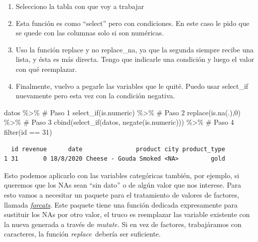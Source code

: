 \documentclass[
  letterpaper,
  DIV=11,
  numbers=noendperiod]{scrreprt}
\newenvironment{Shaded}{\begin{snugshade}}{\end{snugshade}}
\newcommand{\CommentTok}[1]{\textcolor[rgb]{0.37,0.37,0.37}{#1}}
\newcommand{\DecValTok}[1]{\textcolor[rgb]{0.68,0.00,0.00}{#1}}
\newcommand{\FunctionTok}[1]{\textcolor[rgb]{0.28,0.35,0.67}{#1}}
\newcommand{\NormalTok}[1]{\textcolor[rgb]{0.00,0.23,0.31}{#1}}
\newcommand{\SpecialCharTok}[1]{\textcolor[rgb]{0.37,0.37,0.37}{#1}}
\providecommand{\tightlist}{%
  \setlength{\itemsep}{0pt}\setlength{\parskip}{0pt}}\usepackage{longtable,booktabs,array}
\begin{document}
\begin{enumerate}
\def\labelenumi{\arabic{enumi}.}
\tightlist
\item
  Selecciono la tabla con que voy a trabajar
\item
  Esta función es como ``select'' pero con condiciones. En este caso le
  pido que se quede con las columnas solo si son numéricas.
\item
  Uso la función replace y no replace\_na, ya que la segunda siempre
  recibe una lista, y ésta es más directa. Tengo que indicarle una
  condición y luego el valor con qué reemplazar.
\item
  Finalmente, vuelvo a pegarle las variables que le quité. Puedo usar
  select\_if nuevamente pero esta vez con la condición negativa.
\end{enumerate}

\begin{Shaded}
\begin{Highlighting}[]
\NormalTok{datos }\SpecialCharTok{\%\textgreater{}\%} \CommentTok{\# Paso 1}
  \FunctionTok{select\_if}\NormalTok{(is.numeric) }\SpecialCharTok{\%\textgreater{}\%} \CommentTok{\# Paso 2}
  \FunctionTok{replace}\NormalTok{(}\FunctionTok{is.na}\NormalTok{(.),}\DecValTok{0}\NormalTok{) }\SpecialCharTok{\%\textgreater{}\%} \CommentTok{\# Paso 3}
  \FunctionTok{cbind}\NormalTok{(}\FunctionTok{select\_if}\NormalTok{(datos, }\FunctionTok{negate}\NormalTok{(is.numeric))) }\SpecialCharTok{\%\textgreater{}\%} \CommentTok{\# Paso 4}
  \FunctionTok{filter}\NormalTok{(id }\SpecialCharTok{==} \DecValTok{31}\NormalTok{)}
\end{Highlighting}
\end{Shaded}

\begin{verbatim}
  id revenue      date               product city product_type
1 31       0 18/8/2020 Cheese - Gouda Smoked <NA>         gold
\end{verbatim}

Esto podemos aplicarlo con las variables categóricas también, por
ejemplo, si queremos que los NAs sean ``sin dato'' o de algún valor que
nos interese. Para esto vamos a necesitar un paquete para el tratamiento
de valores de factores, llamada
\href{https://www.rdocumentation.org/packages/forcats/versions/0.4.0}{\emph{forcats}}.
Este paquete tiene una función dedicada expresamente para sustituir los
NAs por otro valor, el truco es reemplazar las variable existente con la
nueva generada a través de \emph{mutate.} Si en vez de factores,
trabajáramos con caracteres, la función \emph{replace}~debería ser
suficiente.
\end{document}
